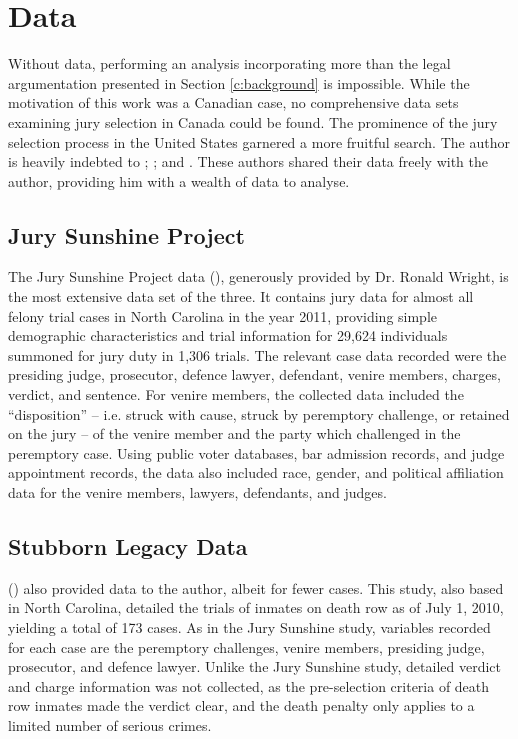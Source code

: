 \section{Data} \label{c:data}

Without data, performing an analysis incorporating more than the
legal argumentation presented in Section \ref{c:background} is impossible. While the motivation of this work was a Canadian case, no comprehensive
data sets examining jury selection in Canada could be found. The prominence of the jury selection process
in the United States garnered a more fruitful search. The author is heavily indebted to \citeauthor{JurySunshineProj}; \citeauthor{StubbornLegacy}; and
\citeauthor{PerempChalMurder}. These authors shared their data freely with the author, providing him with a wealth of data to
analyse.

\subsection{Jury Sunshine Project} \label{sec:jspdata}

The Jury Sunshine Project data (\cite{JurySunshineProj}), generously provided by Dr. Ronald Wright, is the most extensive data set of the three. It
contains jury data for almost all felony trial cases in North Carolina in the year 2011, providing simple demographic
characteristics and trial information for 29,624 individuals summoned
for jury duty in 1,306 trials. The relevant case data recorded were the presiding judge, prosecutor, defence lawyer, defendant, venire members,
charges, verdict, and sentence. For venire members, the collected data included the ``disposition'' -- i.e. struck with cause, struck by peremptory challenge, or retained on the jury -- of the venire member and the party which challenged in the peremptory case. Using public voter databases, bar admission records, and judge appointment records, the data also included race, gender, and political
affiliation data for the venire members, lawyers, defendants, and judges.

\subsection{Stubborn Legacy Data} \label{sec:norcardata}

(\cite{StubbornLegacy}) also provided data to the author, albeit for fewer cases. This study, also based in North Carolina,
detailed the trials of inmates on death row as of July 1, 2010, yielding a total of 173 cases. As in the Jury Sunshine study, variables recorded for each case are the peremptory challenges, venire members, presiding judge, prosecutor, and defence lawyer. Unlike the Jury Sunshine study, detailed verdict and charge information was not collected, as the pre-selection criteria of death row inmates made the verdict clear, and the death penalty only applies to a limited number of serious crimes.


